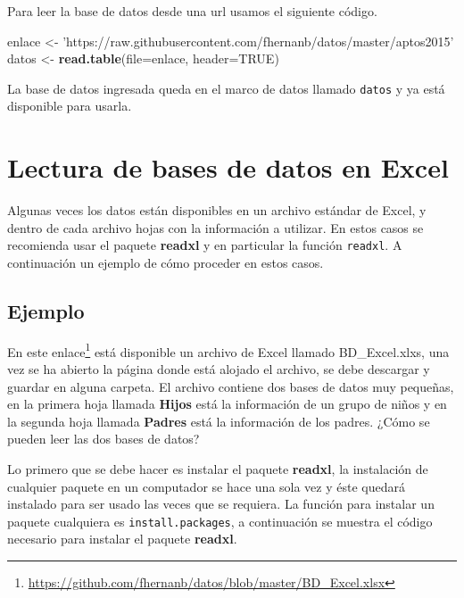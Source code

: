 \documentclass[10pt,]{krantz}
\makeatletter
\newenvironment{Shaded}{\begin{snugshade}}{\end{snugshade}}
\newcommand{\KeywordTok}[1]{\textcolor[rgb]{0.13,0.29,0.53}{\textbf{#1}}}
\newcommand{\DataTypeTok}[1]{\textcolor[rgb]{0.13,0.29,0.53}{#1}}
\newcommand{\StringTok}[1]{\textcolor[rgb]{0.31,0.60,0.02}{#1}}
\newcommand{\OtherTok}[1]{\textcolor[rgb]{0.56,0.35,0.01}{#1}}
\newcommand{\NormalTok}[1]{#1}
\renewcommand{\href}[2]{#2\footnote{\url{#1}}}
\newenvironment{kframe}{%
\medskip{}
\setlength{\fboxsep}{.8em}
 \def\at@end@of@kframe{}%
 \ifinner\ifhmode%
  \def\at@end@of@kframe{\end{minipage}}%
  \begin{minipage}{\columnwidth}%
 \fi\fi%
 \def\FrameCommand##1{\hskip\@totalleftmargin \hskip-\fboxsep
 \colorbox{shadecolor}{##1}\hskip-\fboxsep
     \hskip-\linewidth \hskip-\@totalleftmargin \hskip\columnwidth}%
 \MakeFramed {\advance\hsize-\width
   \@totalleftmargin\z@ \linewidth\hsize
   \@setminipage}}%
 {\par\unskip\endMakeFramed%
 \at@end@of@kframe}
\renewenvironment{Shaded}{\begin{kframe}}{\end{kframe}}
\makeatother
\begin{document}
Para leer la base de datos desde una url usamos el siguiente código.

\begin{Shaded}
\begin{Highlighting}[]
\NormalTok{enlace <-}\StringTok{ 'https://raw.githubusercontent.com/fhernanb/datos/master/aptos2015'}
\NormalTok{datos <-}\StringTok{ }\KeywordTok{read.table}\NormalTok{(}\DataTypeTok{file=}\NormalTok{enlace, }\DataTypeTok{header=}\OtherTok{TRUE}\NormalTok{)}
\end{Highlighting}
\end{Shaded}

La base de datos ingresada queda en el marco de datos llamado
\texttt{datos} y ya está disponible para usarla.

\section{Lectura de bases de datos en
Excel}\label{lectura-de-bases-de-datos-en-excel}

Algunas veces los datos están disponibles en un archivo estándar de
Excel, y dentro de cada archivo hojas con la información a utilizar. En
estos casos se recomienda usar el paquete \textbf{readxl}
\citep{R-readxl} y en particular la función \texttt{readxl}. A
continuación un ejemplo de cómo proceder en estos casos.

\subsection*{Ejemplo}\label{ejemplo-26}


En este
\href{https://github.com/fhernanb/datos/blob/master/BD_Excel.xlsx}{enlace}
está disponible un archivo de Excel llamado BD\_Excel.xlxs, una vez se
ha abierto la página donde está alojado el archivo, se debe descargar y
guardar en alguna carpeta. El archivo contiene dos bases de datos muy
pequeñas, en la primera hoja llamada \textbf{Hijos} está la información
de un grupo de niños y en la segunda hoja llamada \textbf{Padres} está
la información de los padres. ¿Cómo se pueden leer las dos bases de
datos?

Lo primero que se debe hacer es instalar el paquete \textbf{readxl}, la
instalación de cualquier paquete en un computador se hace una sola vez y
éste quedará instalado para ser usado las veces que se requiera. La
función para instalar un paquete cualquiera es
\texttt{install.packages}, a continuación se muestra el código necesario
para instalar el paquete \textbf{readxl}.
\end{document}
